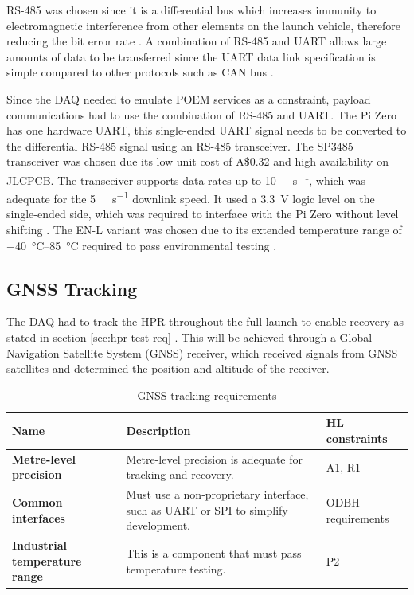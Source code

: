 \documentclass{report}
\newcommand*{\secref}[1]{section \hyperref[{#1}]{\ref*{#1} \nameref*{#1}}}
\newcommand{\aud}{A\$}
\begin{document}
RS-485 was chosen since it is a differential bus which increases immunity to electromagnetic interference from other elements on the launch vehicle, therefore reducing the bit error rate \cite{cratere2024board}. A combination of RS-485 and UART allows large amounts of data to be transferred since the UART data link specification is simple compared to other protocols such as CAN bus \cite{cratere2024board}.

Since the DAQ needed to emulate POEM services as a constraint, payload communications had to use the combination of RS-485 and UART. The Pi Zero has one hardware UART, this single-ended UART signal needs to be converted to the differential RS-485 signal using an RS-485 transceiver. The SP3485 transceiver was chosen due its low unit cost of \aud 0.32 and high availability on JLCPCB. The transceiver supports data rates up to \SI{10}{\mega\bit\per\second}, which was adequate for the \SI{5}{\kilo\bit\per\second} downlink speed. It used a \SI{3.3}{\volt} logic level on the single-ended side, which was required to interface with the Pi Zero without level shifting \cite{maxlinear2021sp3485}. The EN-L variant was chosen due to its extended temperature range of \SIrange{-40}{85}{\degreeCelsius} required to pass environmental testing \cite{maxlinear2021sp3485}.

\subsection{GNSS Tracking}

The DAQ had to track the HPR throughout the full launch to enable recovery as stated in \secref{sec:hpr-test-req}. This will be achieved through a Global Navigation Satellite System (GNSS) receiver, which received signals from GNSS satellites and determined the position and altitude of the receiver.


\begin{table}[H]
  \centering
  \begin{tabular}{|L{0.2\textwidth}|L{0.495\textwidth}|L{0.2\textwidth}|}
    \hline
    \textbf{Name}                         & \textbf{Description}                                                               & \textbf{HL constraints} \\ \hline
    \textbf{Metre-level precision}        & Metre-level precision is adequate for tracking and recovery.                       & A1, R1                  \\\hline
    \textbf{Common interfaces}            & Must use a non-proprietary interface, such as UART or SPI to simplify development. & ODBH requirements       \\\hline
    \textbf{Industrial temperature range} & This is a component that must pass temperature testing.                            & P2                      \\\hline
  \end{tabular}
  \caption{GNSS tracking requirements}
  \label{tabl:gnss-requirements}
\end{table}
\end{document}
